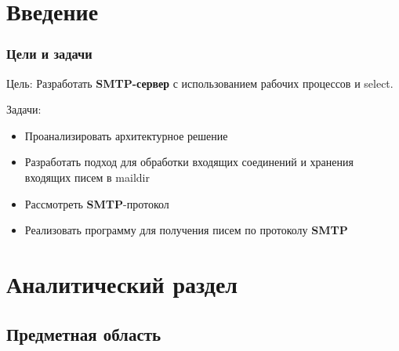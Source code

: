 \documentclass[a4paper,12pt]{report}
\begin{document}
\maketitle

\tableofcontents

\chapter*{Введение}
\subsection{Цели и задачи}

Цель: 
    Разработать \textbf{SMTP-сервер} с использованием рабочих процессов и select.

Задачи:
\begin{itemize}
    \item Проанализировать архитектурное решение
    \item Разработать подход для обработки входящих соединений и хранения входящих писем в maildir
    \item Рассмотреть \textbf{SMTP}-протокол
    \item Реализовать программу для получения писем по протоколу \textbf{SMTP}
\end{itemize}

\chapter{Аналитический раздел}

\section*{Предметная область}
\end{document}

